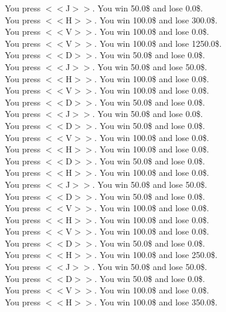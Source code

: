 \documentclass[pdflatex,sn-nature]{sn-jnl}%
\theoremstyle{thmstyleone}%
\theoremstyle{thmstyletwo}%
\theoremstyle{thmstylethree}%
\begin{document}
You press $<<$J$>>$. You win 50.0\$ and lose 0.0\$. $~$\\ 
You press $<<$H$>>$. You win 100.0\$ and lose 300.0\$. $~$\\ 
You press $<<$V$>>$. You win 100.0\$ and lose 0.0\$. $~$\\ 
You press $<<$V$>>$. You win 100.0\$ and lose 1250.0\$. $~$\\ 
You press $<<$D$>>$. You win 50.0\$ and lose 0.0\$. $~$\\ 
You press $<<$J$>>$. You win 50.0\$ and lose 50.0\$. $~$\\ 
You press $<<$H$>>$. You win 100.0\$ and lose 0.0\$. $~$\\ 
You press $<<$V$>>$. You win 100.0\$ and lose 0.0\$. $~$\\ 
You press $<<$D$>>$. You win 50.0\$ and lose 0.0\$. $~$\\ 
You press $<<$J$>>$. You win 50.0\$ and lose 0.0\$. $~$\\ 
You press $<<$D$>>$. You win 50.0\$ and lose 0.0\$. $~$\\ 
You press $<<$V$>>$. You win 100.0\$ and lose 0.0\$. $~$\\ 
You press $<<$H$>>$. You win 100.0\$ and lose 0.0\$. $~$\\ 
You press $<<$D$>>$. You win 50.0\$ and lose 0.0\$. $~$\\ 
You press $<<$H$>>$. You win 100.0\$ and lose 0.0\$. $~$\\ 
You press $<<$J$>>$. You win 50.0\$ and lose 50.0\$. $~$\\ 
You press $<<$D$>>$. You win 50.0\$ and lose 0.0\$. $~$\\ 
You press $<<$V$>>$. You win 100.0\$ and lose 0.0\$. $~$\\ 
You press $<<$H$>>$. You win 100.0\$ and lose 0.0\$. $~$\\ 
You press $<<$V$>>$. You win 100.0\$ and lose 0.0\$. $~$\\ 
You press $<<$D$>>$. You win 50.0\$ and lose 0.0\$. $~$\\ 
You press $<<$H$>>$. You win 100.0\$ and lose 250.0\$. $~$\\ 
You press $<<$J$>>$. You win 50.0\$ and lose 50.0\$. $~$\\ 
You press $<<$D$>>$. You win 50.0\$ and lose 0.0\$. $~$\\ 
You press $<<$V$>>$. You win 100.0\$ and lose 0.0\$. $~$\\ 
You press $<<$H$>>$. You win 100.0\$ and lose 350.0\$. $~$\\ 
\end{document}
